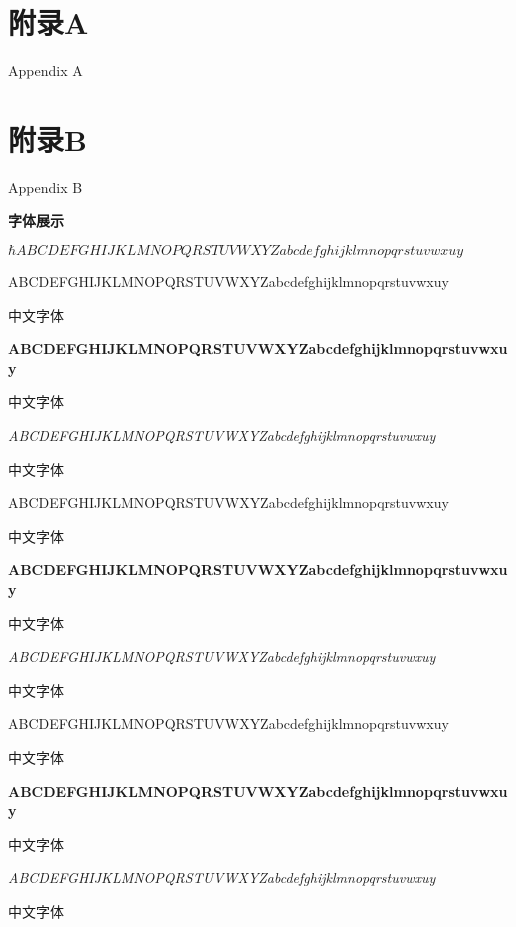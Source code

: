 \documentclass[bibstyle=super,font=empty]{Settings/XMUthesis}
\begin{document}
\frontmatter\xiaosi
\maketitle
%



\xmutableofcontents
\mainmatter%
\pagestyle{fancy}


\backmatter
\nocite{*} 


\chapter{附录A}{Appendix A}

\chapter{附录B}{Appendix B}

\begin{center}
\textbf{字体展示}
\end{center}

\( \hbar ABCDEFGHIJKLMNOPQRSTUVWXYZabcdefghijklmnopqrstuvwxuy \)


 ABCDEFGHIJKLMNOPQRSTUVWXYZabcdefghijklmnopqrstuvwxuy 
 
 中文字体

{\bfseries ABCDEFGHIJKLMNOPQRSTUVWXYZabcdefghijklmnopqrstuvwxuy 
 
 中文字体}

\itshape ABCDEFGHIJKLMNOPQRSTUVWXYZabcdefghijklmnopqrstuvwxuy 
 
 中文字体

\sffamily ABCDEFGHIJKLMNOPQRSTUVWXYZabcdefghijklmnopqrstuvwxuy 

中文字体

\bfseries ABCDEFGHIJKLMNOPQRSTUVWXYZabcdefghijklmnopqrstuvwxuy 
 
 中文字体
\newpage

\itshape ABCDEFGHIJKLMNOPQRSTUVWXYZabcdefghijklmnopqrstuvwxuy 
 
 中文字体

\ttfamily ABCDEFGHIJKLMNOPQRSTUVWXYZabcdefghijklmnopqrstuvwxuy 

中文字体

\bfseries ABCDEFGHIJKLMNOPQRSTUVWXYZabcdefghijklmnopqrstuvwxuy 
 
 中文字体

\itshape ABCDEFGHIJKLMNOPQRSTUVWXYZabcdefghijklmnopqrstuvwxuy 
 
 中文字体
\end{document}
